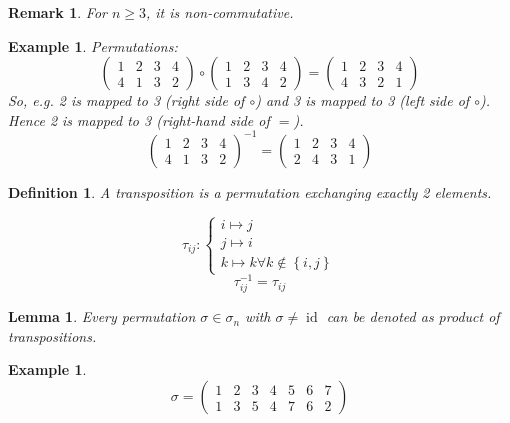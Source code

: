 \documentclass[a4paper]{article}
\newcounter{lecref}[section]
\numberwithin{lecref}{section}
\newtheorem{example}[lecref]{Example}
\newtheorem*{Example}{Example}
\newtheorem{definition}[lecref]{Definition}
\newtheorem*{Lemma}{Lemma}
\newtheorem{remark}[lecref]{Remark}
\newcommand{\set}[1]{\left\{#1\right\}}
\begin{document}
\begin{remark} %
  For $n \geq 3$, it is non-commutative.
\end{remark}

\begin{example} %
  Permutations:
  \[ \begin{pmatrix} 1 & 2 & 3 & 4 \\ 4 & 1 & 3 & 2 \end{pmatrix} \circ \begin{pmatrix} 1 & 2 & 3 & 4 \\ 1 & 3 & 4 & 2 \end{pmatrix} = \begin{pmatrix} 1 & 2 & 3 & 4 \\ 4 & 3 & 2 & 1 \end{pmatrix} \]
  So, e.g. 2 is mapped to 3 (right side of $\circ$) and 3 is mapped to 3 (left side of $\circ$). Hence 2 is mapped to 3 (right-hand side of $=$).
  \[ \begin{pmatrix} 1 & 2 & 3 & 4 \\ 4 & 1 & 3 & 2 \end{pmatrix}^{-1} = \begin{pmatrix} 1 & 2 & 3 & 4 \\ 2 & 4 & 3 & 1 \end{pmatrix} \]
\end{example}

\begin{definition}
  A \emph{transposition} is a permutation exchanging exactly 2 elements.

  \[
    \tau_{ij} : \begin{cases}
      i \mapsto j \\
      j \mapsto i \\
      k \mapsto k \forall k \notin \set{i,j}
    \end{cases}
  \] \[
    \tau_{ij}^{-1} = \tau_{ij}
  \]
\end{definition}

\begin{Lemma}
  Every permutation $\sigma \in \sigma_n$ with $\sigma \neq \operatorname{id}$ can be denoted as product of transpositions.
\end{Lemma}

\begin{Example}
  \[ \sigma = \begin{pmatrix} 1 & 2 & 3 & 4 & 5 & 6 & 7 \\ 1 & 3 & 5 & 4 & 7 & 6 & 2 \end{pmatrix} \]
\end{Example}
\end{document}
